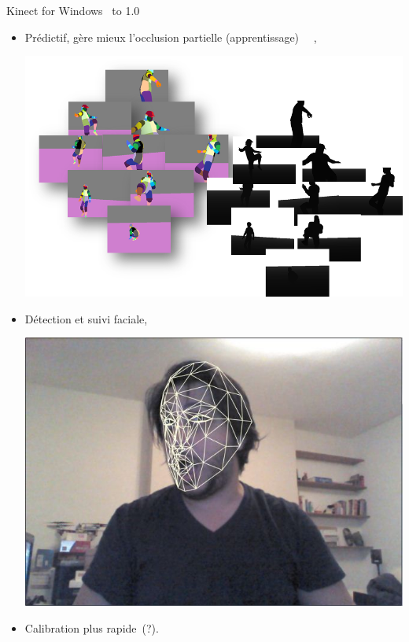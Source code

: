\begin{frame}{Kinect for Windows~\cite{microsoft_vs_openni_2}}
\vbox to 1.0\textheight
{
\begin{itemize}
  \item<1-> Prédictif, gère mieux l'occlusion partielle (apprentissage)
                ~\cite{how_you_become_the_controller}~\cite{shotton2011},
  {
    \vfill
    \begin{center}
    \includegraphics[width=0.7\linewidth]{../images/kinect_learning}
    \end{center}
  }
  \item<2-> Détection et suivi faciale,
  {
    \vfill
    \begin{center}
    \includegraphics[width=0.5\linewidth]{../images/kinect_face_track}
    \end{center}
  }
  \item<3-> Calibration plus rapide~(?).

\end{itemize}
\vfill
}
\end{frame}

